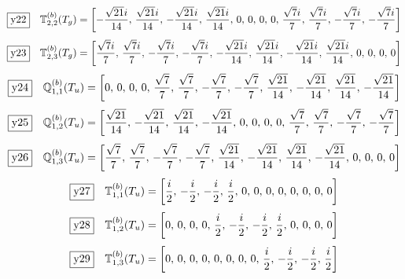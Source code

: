 \documentclass[fleqn,10pt,landscape]{jsarticle}
\begin{document}
\begin{dmath*}
\fbox{y22}\quad \mathbb{T}_{2,2}^{(b)}(T_{g})=\left[ - \frac{\sqrt{21} i}{14},\, \frac{\sqrt{21} i}{14},\, - \frac{\sqrt{21} i}{14},\, \frac{\sqrt{21} i}{14},\, 0,\, 0,\, 0,\, 0,\, \frac{\sqrt{7} i}{7},\, \frac{\sqrt{7} i}{7},\, - \frac{\sqrt{7} i}{7},\, - \frac{\sqrt{7} i}{7} \right]
\end{dmath*}
\begin{dmath*}
\fbox{y23}\quad \mathbb{T}_{2,3}^{(b)}(T_{g})=\left[ \frac{\sqrt{7} i}{7},\, \frac{\sqrt{7} i}{7},\, - \frac{\sqrt{7} i}{7},\, - \frac{\sqrt{7} i}{7},\, - \frac{\sqrt{21} i}{14},\, \frac{\sqrt{21} i}{14},\, - \frac{\sqrt{21} i}{14},\, \frac{\sqrt{21} i}{14},\, 0,\, 0,\, 0,\, 0 \right]
\end{dmath*}
\begin{dmath*}
\fbox{y24}\quad \mathbb{Q}_{1,1}^{(b)}(T_{u})=\left[ 0,\, 0,\, 0,\, 0,\, \frac{\sqrt{7}}{7},\, \frac{\sqrt{7}}{7},\, - \frac{\sqrt{7}}{7},\, - \frac{\sqrt{7}}{7},\, \frac{\sqrt{21}}{14},\, - \frac{\sqrt{21}}{14},\, \frac{\sqrt{21}}{14},\, - \frac{\sqrt{21}}{14} \right]
\end{dmath*}
\begin{dmath*}
\fbox{y25}\quad \mathbb{Q}_{1,2}^{(b)}(T_{u})=\left[ \frac{\sqrt{21}}{14},\, - \frac{\sqrt{21}}{14},\, \frac{\sqrt{21}}{14},\, - \frac{\sqrt{21}}{14},\, 0,\, 0,\, 0,\, 0,\, \frac{\sqrt{7}}{7},\, \frac{\sqrt{7}}{7},\, - \frac{\sqrt{7}}{7},\, - \frac{\sqrt{7}}{7} \right]
\end{dmath*}
\begin{dmath*}
\fbox{y26}\quad \mathbb{Q}_{1,3}^{(b)}(T_{u})=\left[ \frac{\sqrt{7}}{7},\, \frac{\sqrt{7}}{7},\, - \frac{\sqrt{7}}{7},\, - \frac{\sqrt{7}}{7},\, \frac{\sqrt{21}}{14},\, - \frac{\sqrt{21}}{14},\, \frac{\sqrt{21}}{14},\, - \frac{\sqrt{21}}{14},\, 0,\, 0,\, 0,\, 0 \right]
\end{dmath*}
\begin{dmath*}
\fbox{y27}\quad \mathbb{T}_{1,1}^{(b)}(T_{u})=\left[ \frac{i}{2},\, - \frac{i}{2},\, - \frac{i}{2},\, \frac{i}{2},\, 0,\, 0,\, 0,\, 0,\, 0,\, 0,\, 0,\, 0 \right]
\end{dmath*}
\begin{dmath*}
\fbox{y28}\quad \mathbb{T}_{1,2}^{(b)}(T_{u})=\left[ 0,\, 0,\, 0,\, 0,\, \frac{i}{2},\, - \frac{i}{2},\, - \frac{i}{2},\, \frac{i}{2},\, 0,\, 0,\, 0,\, 0 \right]
\end{dmath*}
\begin{dmath*}
\fbox{y29}\quad \mathbb{T}_{1,3}^{(b)}(T_{u})=\left[ 0,\, 0,\, 0,\, 0,\, 0,\, 0,\, 0,\, 0,\, \frac{i}{2},\, - \frac{i}{2},\, - \frac{i}{2},\, \frac{i}{2} \right]
\end{dmath*}
\end{document}
